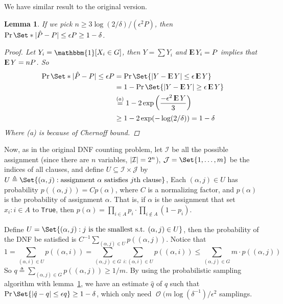 \documentclass[12pt, a4paper]{article}
\DeclarePairedDelimiter{\abs}{\lvert}{\rvert}
\newtheorem{lemma}{Lemma}
\newcommand{\defeq}{\triangleq}
\DeclareMathOperator{\Expect}{{\rm I\kern-.3em E}}
\DeclareMathOperator*{\ord}{\mathcal{O}}
\begin{document}
We have similar result to the original version. \smallskip

\begin{lemma} \label{lemma:modified-sampling}
  If we pick $n \geq 3 \log(2/\delta) / (\epsilon^2 P)$, then
  $ \Pr\Set*{ \abs{\hat{P} - P} \leq \epsilon P } \geq 1 - \delta $.

  \begin{proof}
    Let $Y_i = \raisebox{-.05em}{$\mathlarger{\mathbbm{1}}$}[ X_i \in G ]$,
    then $Y = \sum Y_i$ and $\Expect Y_i = P$ implies that $\Expect Y = nP$.
    So
    \begin{align*}
      \Pr\Set*{ \abs{\hat{P} - P} \leq \epsilon P } &=
      \Pr\Set{\abs{Y - \Expect Y} \leq \epsilon \Expect Y} \\
      &= 1 - \Pr\Set{\abs{Y - \Expect Y} \geq \epsilon \Expect Y} \\
      &\stackrel{(a)}{=} 1 - 2 \exp\left( \frac{-\epsilon^2 \Expect Y}{3} \right) \\
      &\geq 1 - 2 \exp( -\log(2/\delta) ) = 1 - \delta
    \end{align*}
    Where (a) is because of Chernoff bound.
  \end{proof}
\end{lemma}

Now, as in the original DNF counting problem, let $\mathcal{I}$ be all
the possible assignment (since there are $n$ variables, $\abs{\mathcal{I}} = 2^n$),
$\mathcal{J} = \Set{1, \dots, m}$ be the indices of all clauses,
and define $U \subseteq \mathcal{I} \times \mathcal{J}$ by
$U \defeq \Set{ (\alpha, j) : \text{assignment } \alpha \text{ satisfies } j\text{th clause}}$,
Each $(\alpha, j) \in U$ has probability $p((\alpha, j)) = C p(\alpha)$,
where $C$ is a normalizing factor, and $p(\alpha)$ is the probability of assignment $\alpha$.
That is, if $\alpha$ is the assignment that set $x_i : i \in A$ to \texttt{True},
then $p(\alpha) = \prod_{i \in A} p_i \cdot \prod_{i \not\in A} (1 - p_i)$.

Define $U = \Set{(\alpha, j) : j \text{ is the smallest s.t. } (\alpha, j) \in U}$,
then the probability of the DNF be satisfied is $C^{-1} \sum_{(\alpha, j) \in U} p((\alpha, j))$.
Notice that
\[ 1 = \sum_{(\alpha, i) \in U} p((\alpha, i))
  = \sum_{(\alpha, j) \in G} \sum_{i: (\alpha, i) \in U} p((\alpha, i))
  \leq \sum_{(\alpha, j) \in G} m \cdot p((\alpha, j)) \]
So $q \defeq \sum_{(\alpha, j) \in G} p((\alpha, j)) \geq 1 / m$.
By using the probabilistic sampling algorithm with lemma~\ref{lemma:modified-sampling},
we have an estimate $\hat{q}$ of $q$ such that $\Pr\Set{\abs{\hat{q} - q} \leq \epsilon q} \geq 1 - \delta$,
which only need $\ord(m \log(\delta^{-1}) / \epsilon^2$ samplings.
\end{document}
